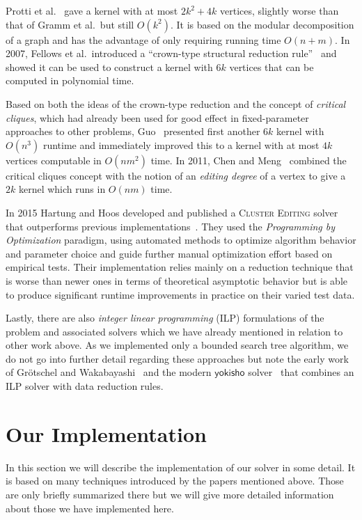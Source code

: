 \documentclass[12pt,oneside,english,parskip=full,headings=small]{scrbook}
\theoremstyle{definition}
\begin{document}
Protti et al.~\cite{Protti} gave a kernel with at most $2k^2 + 4k$ vertices, slightly worse than
that of Gramm et al.\ but still $O(k^2)$. It is based on the modular decomposition of a graph and
has the advantage of only requiring running time $O(n + m)$. In 2007, Fellows et al.\ introduced a
``crown-type structural reduction rule''~\cite{Fellows} and showed it can be used to construct a
kernel with $6k$ vertices that can be computed in polynomial time.

Based on both the ideas of the crown-type reduction and the concept of \emph{critical cliques},
which had already been used for good effect in fixed-parameter approaches to other problems,
Guo~\cite{Guo} presented first another $6k$ kernel with $O(n^3)$ runtime and immediately improved
this to a kernel with at most $4k$ vertices computable in $O(nm^2)$ time. In 2011, Chen and
Meng~\cite{ChenMeng} combined the critical cliques concept with the notion of an \emph{editing
degree} of a vertex to give a $2k$ kernel which runs in $O(nm)$ time.

In 2015 Hartung and Hoos developed and published a \textsc{Cluster Editing} solver that outperforms
previous implementations~\cite{HartungHoos}. They used the \emph{Programming by Optimization}
paradigm, using automated methods to optimize algorithm behavior and parameter choice and guide
further manual optimization effort based on empirical tests. Their implementation relies mainly on a
reduction technique that is worse than newer ones in terms of theoretical asymptotic behavior but is
able to produce significant runtime improvements in practice on their varied test data.

Lastly, there are also \emph{integer linear programming} (ILP) formulations of the problem and
associated solvers which we have already mentioned in relation to other work above. As we
implemented only a bounded search tree algorithm, we do not go into further detail regarding these
approaches but note the early work of Grötschel and Wakabayashi~\cite{CuttingPlane} and the modern
$\mathsf{yokisho}$ solver~\cite{yokisho} that combines an ILP solver with data reduction rules.

\chapter{Our Implementation}

In this section we will describe the implementation of our solver in some detail. It is based on
many techniques introduced by the papers mentioned above. Those are only briefly summarized there
but we will give more detailed information about those we have implemented here.
\end{document}
